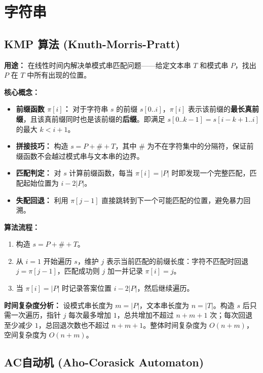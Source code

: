 \section{字符串}

\subsection{KMP 算法 (Knuth-Morris-Pratt)}

\textbf{用途：} 在线性时间内解决单模式串匹配问题——给定文本串 $T$ 和模式串 $P$，找出 $P$ 在 $T$ 中所有出现的位置。

\textbf{核心概念：}
\begin{itemize}
  \item \textbf{前缀函数 $\pi[i]$：} 对于字符串 $s$ 的前缀 $s[0..i]$，$\pi[i]$ 表示该前缀的\textbf{最长真前缀}，且该真前缀同时也是该前缀的\textbf{后缀}。即满足 $s[0..k-1] = s[i-k+1..i]$ 的最大 $k < i+1$。
  \item \textbf{拼接技巧：} 构造 $s = P + \# + T$，其中 $\#$ 为不在字符集中的分隔符，保证前缀函数不会越过模式串与文本串的边界。
  \item \textbf{匹配判定：} 对 $s$ 计算前缀函数，每当 $\pi[i] = |P|$ 时即发现一个完整匹配，匹配起始位置为 $i - 2|P|$。
  \item \textbf{失配回退：} 利用 $\pi[j-1]$ 直接跳转到下一个可能匹配的位置，避免暴力回溯。
\end{itemize}

\textbf{算法流程：}
\begin{enumerate}
  \item 构造 $s = P + \# + T$。
  \item 从 $i=1$ 开始遍历 $s$，维护 $j$ 表示当前匹配的前缀长度：字符不匹配时回退 $j = \pi[j-1]$，匹配成功则 $j$ 加一并记录 $\pi[i] = j$。
  \item 当 $\pi[i] = |P|$ 时记录答案位置 $i - 2|P|$，然后继续遍历。
\end{enumerate}

\textbf{时间复杂度分析：}
设模式串长度为 $m = |P|$，文本串长度为 $n = |T|$。构造 $s$ 后只需一次遍历，指针 $j$ 每次最多增加 $1$，总共增加不超过 $n+m+1$ 次；每次回退至少减少 $1$，总回退次数也不超过 $n+m+1$。整体时间复杂度为 $O(n + m)$，空间复杂度为 $O(n + m)$。



\subsection{AC自动机 (Aho-Corasick Automaton)}

